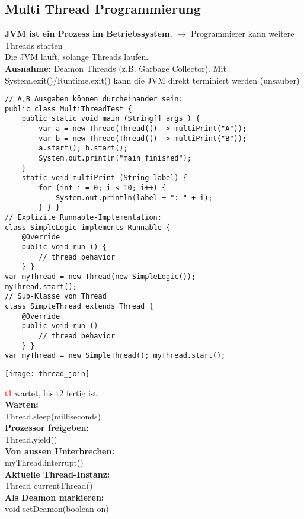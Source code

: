 \subsection{Multi Thread Programmierung}
\textbf{JVM ist ein Prozess im Betriebssystem.} $\rightarrow$ Programmierer kann weitere Threads starten\\
Die JVM läuft, solange Threads laufen.\\
\textbf{Ausnahme:} Deamon Threads (z.B. Garbage Collector). Mit \textcolor{b}{System.exit()/Runtime.exit()} kann die JVM direkt terminiert werden (unsauber)
\begin{lstlisting}
// A,B Ausgaben können durcheinander sein:
public class MultiThreadTest {
    public static void main (String[] args ) {
        var a = new Thread(Thread(() -> multiPrint("A"));
        var b = new Thread(Thread(() -> multiPrint("B"));
        a.start(); b.start();
        System.out.println("main finished");
    }
    static void multiPrint (String label) {
        for (int i = 0; i < 10; i++) {
            System.out.println(label + ": " + i);
        } } }
// Explizite Runnable-Implementation:
class SimpleLogic implements Runnable {
    @Override
    public void run () {
        // thread behavior
    } }
var myThread = new Thread(new SimpleLogic());
myThread.start();
// Sub-Klasse von Thread
class SimpleThread extends Thread {
    @Override
    public void run ()
        // thread behavior
    } }
var myThread = new SimpleThread(); myThread.start();
\end{lstlisting}
\begin{minipage}{0.4\linewidth}
    \texttt{[image: thread\_join]}
\end{minipage}
\begin{minipage}{0.5\linewidth}
    \textcolor{red}{t1} wartet, bis \textcolor{b}{t2} fertig ist.\\
    \textbf{Warten:}\\
    Thread.sleep(milliseconds)\\
    \textbf{Prozessor freigeben:}\\
    Thread.yield()\\
    \textbf{Von aussen Unterbrechen:}\\
    myThread.interrupt()\\
    \textbf{Aktuelle Thread-Instanz:}\\
    Thread currentThread()\\
    \textbf{Als Deamon markieren:}\\
    void setDeamon(boolean on)
\end{minipage}